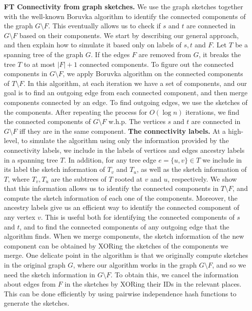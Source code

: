 {{ %
\noindent\textbf{FT Connectivity from graph sketches.} We use the graph sketches together with the well-known Boruvka algorithm \cite{Boruvka} to identify the connected components of the graph $G \setminus F$. This eventually allows us to check if $s$ and $t$ are connected in $G \setminus F$ based on their components. We start by describing our general approach, and then explain how to simulate it based only on labels of $s,t$ and $F$. Let $T$ be a spanning tree of the graph $G$. If the edges $F$ are removed from $G$, it breaks the tree $T$ to at most $|F|+1$ connected components. To figure out the connected components in $G \setminus F$, we apply Boruvka algorithm on the connected components of $T \setminus F$. In this algorithm, at each iteration we have a set of components, and our goal is to find an outgoing edge from each connected component, and then merge components connected by an edge. To find outgoing edges, we use the sketches of the components. After repeating the process for $O(\log{n})$ iterations, we find the connected components of $G \setminus F$ w.h.p. The vertices $s$ and $t$ are connected in $G \setminus F$ iff they are in the same component. 
\noindent\textbf{The connectivity labels.} At a high-level, to simulate the algorithm using only the information provided by the connectivity labels, we include in the labels of vertices and edges ancestry labels in a spanning tree $T$. In addition, for any tree edge $e=\{u,v\} \in T$ we include in its label the sketch information of $T_v$ and $T_u$, as well as the sketch information of $T$, where $T_v,T_u$ are the subtrees of $T$ rooted at $v$ and $u$, respectively. 
We show that this information allows us to identify the connected components in $T \setminus F$, and compute the sketch information of each one of the components. Moreover, the ancestry labels give us an efficient way to identify the connected component of any vertex $v$. This is useful both for identifying the connected components of $s$ and $t$, and to find the connected components of any outgoing edge that the algorithm finds. When we merge components, the sketch information of the new component can be obtained by XORing the sketches of the components we merge. One delicate point in the algorithm is that we originally compute sketches in the original graph $G$, where our algorithm works in the graph $G \setminus F$, and so we need the sketch information in $G \setminus F$. To obtain this, we cancel the information about edges from $F$ in the sketches by XORing their IDs in the relevant places. This can be done efficiently by using pairwise independence hash functions to generate the sketches. 
}
}


